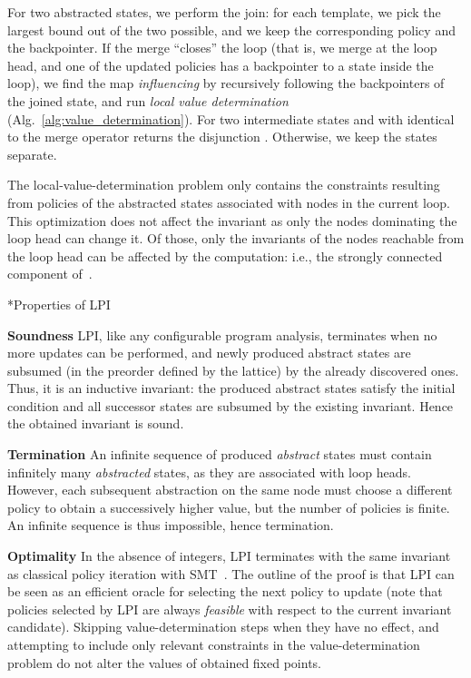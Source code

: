 \documentclass{llncs}
\makeatletter
\renewcommand{\paragraph}{\@startsection{paragraph}{4}{\z@}{0.8ex \@plus 0ex \@minus 1ex}{-1em}{\normalfont\normalsize\bfseries}}
\makeatother
\begin{document}
For two abstracted states, we perform the join: for each template,
we pick the largest bound out of the two possible,
and we keep the corresponding policy and the backpointer.
If the merge ``closes'' the loop (that is, we merge at the loop head, and one of
the updated policies has a backpointer to a state inside the loop), we find the
map \emph{influencing} by recursively following the backpointers of the joined
state, and run \emph{local value determination}
(Alg.~\ref{alg:value_determination}).
For two intermediate states  and 
with  identical to 
the merge operator returns the disjunction .
Otherwise, we keep the states separate.

The local-value-determination problem only contains the constraints resulting
from policies of the abstracted states associated with nodes in the current loop.
This optimization does not affect the invariant as only the nodes
dominating the loop head can change it.
Of those, only the invariants of the nodes reachable from the
loop head can be affected by the computation:
i.e., the strongly connected component of~.

\paragraph*{Properties of LPI}~

\noindent\textbf{Soundness} LPI, like any configurable program analysis,
        terminates when no more updates can be performed, and
        newly produced abstract states are subsumed
        (in the preorder defined by the lattice) by the already discovered ones.
        Thus, it is an inductive invariant: the produced abstract states satisfy the
        initial condition and all successor states are subsumed by the existing
        invariant.
        Hence the obtained invariant is sound.

\noindent\textbf{Termination} An infinite sequence of produced \emph{abstract} states must contain
        infinitely many \emph{abstracted} states, as they are associated with
        loop heads.
        However, each subsequent abstraction on the same node must
        choose a different policy to obtain a successively higher value, but the
        number of policies is finite.
        An infinite sequence is thus impossible, hence termination.

\noindent\textbf{Optimality}
    In the absence of integers, LPI terminates with the
    same invariant as classical policy iteration with
    SMT~\cite{policy_iteration_path_focusing}.
    The outline of the proof is that LPI can be seen as an efficient oracle for
    selecting the next policy to update (note that policies selected by LPI are
    always \emph{feasible} with respect to the current invariant candidate).
    Skipping value-determination steps when they have no effect, and attempting to
    include only relevant constraints in the value-determination problem do not
    alter the values of obtained fixed points.
\end{document}

